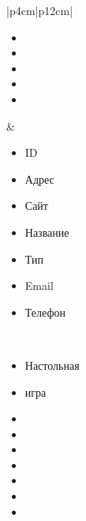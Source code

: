 \begin{table}[h!]
\begin{center}
\begin{threeparttable}
\begin{tabular}{|p{4cm}|p{12cm}|}
\begin{minipage}[t]{\linewidth}
\begin{multicols}{1}
\begin{itemize}[labelsep=0mm,nosep,after=\strut]
                  \item[]
                  \item[]
                  \item[]
                  \item[]
                  \item[]
                \end{itemize}
              \end{multicols}
            \end{minipage}
          & \begin{minipage}[t]{\linewidth}
              \begin{multicols}{2}
                \begin{itemize}[labelsep=0mm,nosep,after=\strut]
                  \item[] ID
                  \item[] Адрес
                  \item[] Сайт
                  \item[] Название
                  \item[] Тип
                  \item[] Email
                  \item[] Телефон
                \end{itemize}
              \end{multicols}
            \end{minipage}\\
            \hline
            \begin{minipage}[t]{\linewidth}
              \begin{multicols}{1}
                \begin{itemize}[labelsep=0mm,nosep,after=\strut]
                  \item[] Настольная
                  \item[] игра
                  \item[]
                  \item[]
                  \item[]
                  \item[]
                  \item[]
                  \item[]
                  \item[]
                \end{itemize}
              \end{multicols}
            \end{minipage}

\end{tabular}
\end{threeparttable}
\end{center}
\end{table}
